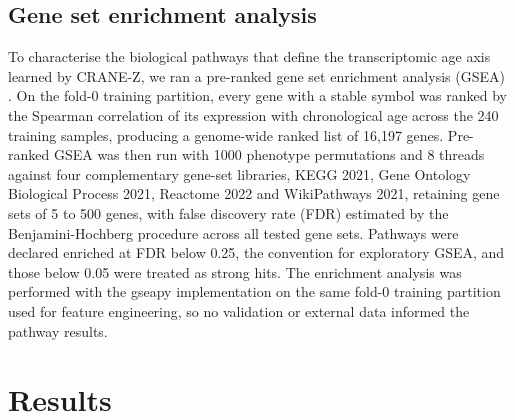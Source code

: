 \documentclass[11pt,a4paper]{article}
\begin{document}
\subsection{Gene set enrichment analysis}\label{sec:gsea-method}
To characterise the biological pathways that define the transcriptomic age axis learned by CRANE-Z, we ran a pre-ranked gene set enrichment analysis (GSEA) \cite{subramanian2005gsea,mootha2003pgc}. On the fold-0 training partition, every gene with a stable symbol was ranked by the Spearman correlation of its expression with chronological age across the 240 training samples, producing a genome-wide ranked list of 16,197 genes. Pre-ranked GSEA was then run with 1000 phenotype permutations and 8 threads against four complementary gene-set libraries, KEGG 2021, Gene Ontology Biological Process 2021, Reactome 2022 and WikiPathways 2021, retaining gene sets of 5 to 500 genes, with false discovery rate (FDR) estimated by the Benjamini-Hochberg procedure across all tested gene sets. Pathways were declared enriched at FDR below 0.25, the convention for exploratory GSEA, and those below 0.05 were treated as strong hits. The enrichment analysis was performed with the gseapy implementation \cite{fang2023gseapy} on the same fold-0 training partition used for feature engineering, so no validation or external data informed the pathway results.

\section{Results}\label{sec:results}
\end{document}
